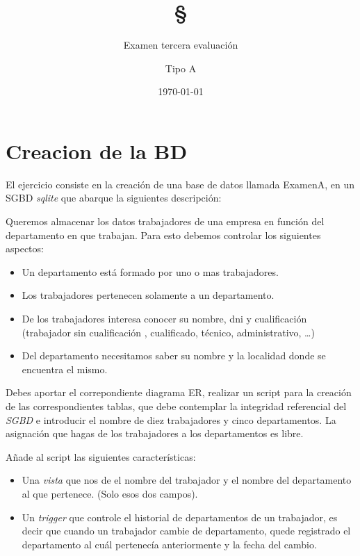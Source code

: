 \documentclass[4paper]{article}
\author{Examen tercera evaluación}
\author{Tipo A}
\title{\textbf{\S}}
\date{\today}
\begin{document}
\maketitle 
\section*{Creacion de la BD}
El ejercicio consiste en la creación de una base de datos llamada ExamenA, en un SGBD \emph{sqlite} que abarque la siguientes descripción:\par 
Queremos almacenar los datos trabajadores de una empresa en función del departamento en que trabajan. Para esto debemos controlar los siguientes aspectos:
\begin{itemize}
\item Un departamento está formado por uno o mas trabajadores.
\item Los trabajadores pertenecen solamente a un departamento.
\item De los trabajadores interesa conocer su nombre, dni y cualificación (trabajador sin cualificación , cualificado, técnico, administrativo, \dots)
\item Del departamento necesitamos saber su nombre y la localidad donde se encuentra el mismo.
\end{itemize}
Debes aportar el correpondiente diagrama ER, realizar un script para la creación de las correspondientes tablas, que debe contemplar la integridad referencial del \emph{SGBD} e introducir el nombre de diez trabajadores y cinco departamentos. La asignación que hagas de los trabajadores a los departamentos es libre.\par 
Añade al script las siguientes características:
\begin{itemize}
\item Una \emph{vista} que nos de el nombre del trabajador y el nombre del departamento al que pertenece. (Solo esos dos campos).
\item Un \emph{trigger} que controle el historial de departamentos de un trabajador, es decir que cuando un trabajador cambie de departamento, quede registrado el departamento al cuál pertenecía anteriormente y la fecha del cambio.
\end{itemize}
\end{document}
